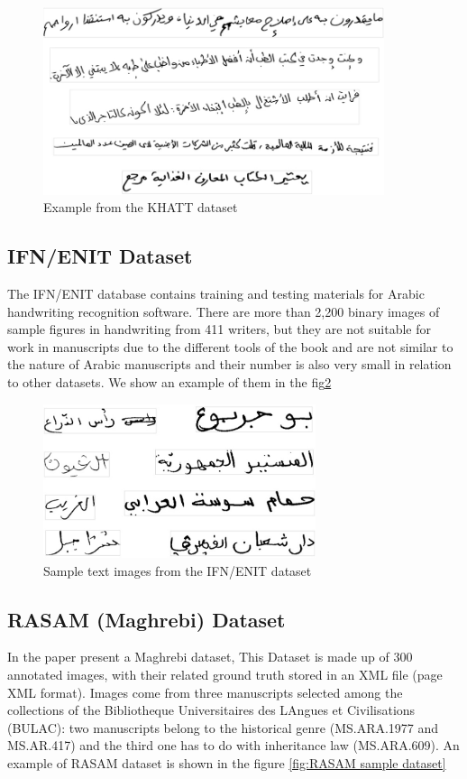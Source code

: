 \begin{figure}[!htb]
    \centering
    \includegraphics[width=10cm]{images/Sample-text-images-from-the-KHATT-database.PNG}
    \caption{Example from the KHATT dataset}
    \label{fig:Sample-text-images-from-the-KHATT-dataset}
\end{figure}


\subsection{IFN/ENIT Dataset}
The IFN/ENIT \cite{IFNENIT} database contains training and testing materials for Arabic handwriting recognition software. There are more than 2,200 binary images of sample figures in handwriting from 411 writers\cite{ali2019efficient}, but they are not suitable for work in manuscripts due to the different tools of the book and are not similar to the nature of Arabic manuscripts and their number is also very small in relation to other datasets. We show an example of them in the fig\ref{fig:Sample text images from the IFN/ENIT dataset}

\begin{figure}[!htb]
    \centering
    \includegraphics[width=8cm]{images/Sample-text-images-from-the-IFN-ENIT-database.png}
    \caption{Sample text images from the IFN/ENIT dataset}
    \label{fig:Sample text images from the IFN/ENIT dataset}
\end{figure}

\subsection{RASAM (Maghrebi) Dataset}
In the paper \cite{RASAM} present a Maghrebi dataset, This Dataset is made up of 300 annotated images, with their related ground truth stored in an XML file (page XML format). Images come from three manuscripts selected among the collections of the Bibliotheque Universitaires des LAngues et Civilisations (BULAC): two manuscripts belong to the historical genre (MS.ARA.1977 and MS.AR.417) and the third one has to do with inheritance law (MS.ARA.609). An example of RASAM dataset is shown in the figure \ref{fig:RASAM sample dataset}

